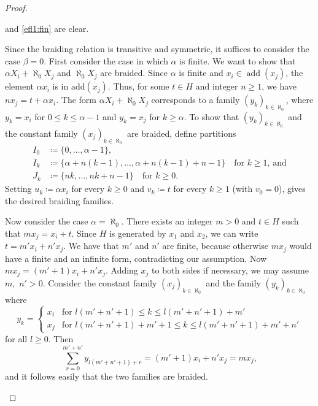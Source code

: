 \documentclass[a4paper,11pt,oneside]{amsart}
\theoremstyle{remark}
\DeclareMathOperator{\add}{add}
\begin{document}
\begin{proof}
  \begin{proofenumerate}
  \item[\ref{efl1:inf-fin}] and \ref{efl1:fin} are clear.
  
  \item[\ref{efl1:add-inclusion}]
  Since the braiding relation is transitive and symmetric, it suffices to consider the case $\beta=0$.
  First consider the case in which $\alpha$ is finite.
  We want to show that $\alpha X_i + \aleph_0 X_j$ and $\aleph_0 X_j$ are braided. 
  Since $\alpha$ is finite and $x_i \in \add(x_j)$, the element $\alpha x_i$ is in $\text{add} (x_j)$.
  Thus, for some $t \in H$ and integer $n \geq 1$, we have $nx_j = t + \alpha x_i$.
  The form $\alpha X_i + \aleph_0 X_j$ corresponds to a family $(y_k)_{k \in \aleph_0}$, where $y_k = x_i$ for $0 \leq k \leq \alpha-1$ and $y_k = x_j$ for $k \geq \alpha$.
  To show that $(y_k)_{k \in \aleph_0}$ and the constant family $(x_j)_{k \in \aleph_0}$ are braided, define partitions
  \[
    \begin{split}
      I_0 & \coloneqq \{ 0, \ldots, \alpha-1\},\\
      I_k &\coloneqq \{ \alpha + n(k-1), \ldots, \alpha + n (k - 1) + n - 1 \} \quad\text{for $k \ge 1$, and}\\
      J_k &\coloneqq \{ n k, \ldots,  n k + n - 1 \} \quad\text{for $k \ge 0$}.
    \end{split}
  \]
  Setting $u_k \coloneqq \alpha x_i$ for every $k \ge 0$ and $v_k \coloneqq t$ for every $k \ge 1$ (with $v_0=0$), gives the desired braiding families.
  
  Now consider the case $\alpha = \aleph_{0}$.
  There exists an integer $m >0$ and $t \in H$ such that $m x_j = x_i + t$.
  Since $H$ is generated by $x_1$ and $x_2$, we can write $t = m' x_i + n' x_j$.
  We have that $m'$ and $n'$ are finite, because otherwise $m x_j$ would have a finite and an infinite form, contradicting our assumption.
  Now $m x_j = (m' + 1) x_i + n' x_j$.
  Adding $x_j$ to both sides if necessary, we may assume $m$,~$n' > 0$.
  Consider the constant family $(x_j)_{k \in \aleph_0}$ and the family $(y_k)_{k \in \aleph_0}$ where
  \[
    y_k =
    \begin{cases}
      x_i & \text{for $l(m'+n'+1) \le k \le l(m'+n'+1) + m'$} \\
      x_j & \text{for $l(m'+n'+1)+m'+1 \le k \le l(m'+n'+1)+m'+n'$}
    \end{cases}
  \]
  for all $l \ge 0$.
  Then
  \[
    \sum_{r=0}^{m'+n'} y_{l(m'+n'+1)+r} = (m'+1)x_i + n'x_j= m x_j,
  \]
  and it follows easily that the two families are braided.


\end{proofenumerate}
\end{proof}
\end{document}
